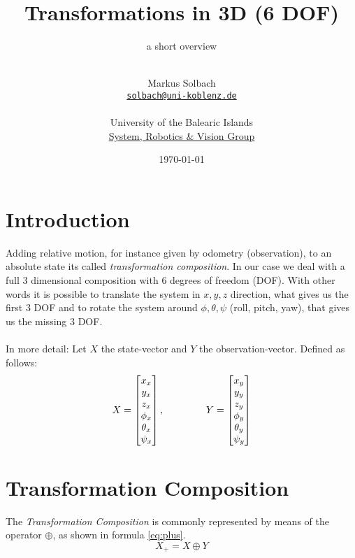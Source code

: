 \documentclass[10pt,a4paper]{scrartcl}
\author{\\Markus Solbach \\ \href{mailto:solbach@uni-koblenz.de}{\texttt{solbach@uni-koblenz.de}} \\\\  University of the Balearic Islands \\ \href{http://srv.uib.es/}{System, Robotics \& Vision Group} }
\date{\today}
\begin{document}
\title{Transformations in 3D (6 DOF)}
\subtitle{a short overview}
\maketitle\newpage

\listoftodos

\newpage

\section{Introduction}\label{ch:intro}
Adding relative motion, for instance given by odometry (observation), to an absolute state its called \textit{transformation composition}. In our case we deal with a full 3 dimensional composition with 6 degrees of freedom (DOF). With other words it is possible to translate the system in $x, y, z$ direction, what gives us the first 3 DOF and to rotate the system around $\phi, \theta, \psi$ (roll, pitch, yaw), that gives us the missing 3 DOF.
\\\\ In more detail: Let $X$ the state-vector and $Y$ the observation-vector. Defined as follows:
\begin{equation}
X = \begin{bmatrix} x_x \\ y_x \\ z_x \\ \phi_x \\ \theta_x \\ \psi_x \end{bmatrix}, \hspace{15 mm} Y = \begin{bmatrix} x_y \\ y_y \\ z_y \\ \phi_y \\ \theta_y \\ \psi_y \end{bmatrix}
\end{equation}


\section{Transformation Composition}
The \textit{Transformation Composition} is commonly represented by means of the operator $\oplus$, as shown in formula \ref{eq:plus}.
\begin{equation}\label{eq:plus}
X_+ = X \oplus Y
\end{equation}
\end{document}
